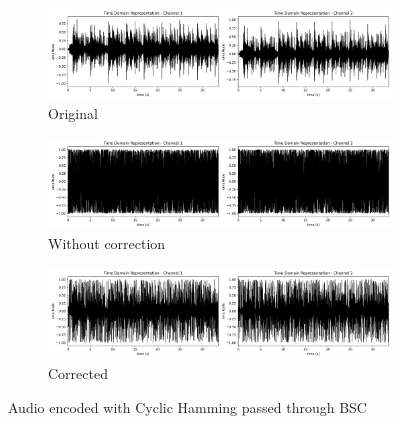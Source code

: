 \documentclass{article}
\begin{document}
\begin{figure}[htb]
    \centering
    \begin{subfigure}[b]{\textwidth}
        \centering
        \includegraphics[width=\textwidth]{../Result/Cyclic/15-11/wav-time-domain-TX.png}
        \caption{Original}
        \label{fig:t-audio-cyclic-bsc-original}
    \end{subfigure}
    \begin{subfigure}[b]{\textwidth}
        \centering
        \includegraphics[width=\textwidth]{../Result/Cyclic/15-11/cyclic-bsc-wav-time-domain-RX.png}
        \caption{Without correction}
        \label{fig:t-audio-cyclic-bsc-no-correction}
    \end{subfigure}
    \begin{subfigure}[b]{\textwidth}
        \centering
        \includegraphics[width=\textwidth]{../Result/Cyclic/15-11/cyclic-bsc-wav-time-domain-RX-syndrome-corrected.png}
        \caption{Corrected}
        \label{fig:t-audio-cyclic-bsc-syndrome-syndrome-corrected}
    \end{subfigure}
       \caption{Audio encoded with Cyclic Hamming passed through BSC}
       \label{fig:t-audio-cyclic-bsc}
\end{figure}
\end{document}
